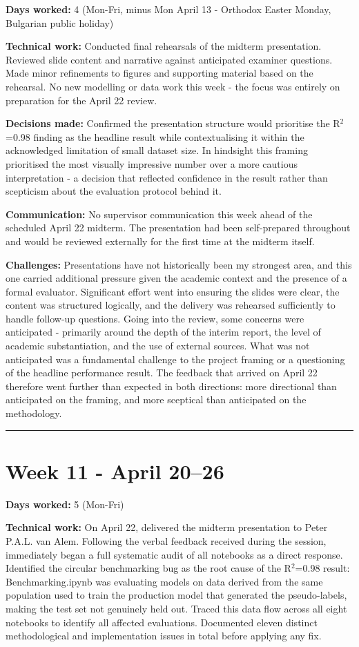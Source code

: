 \documentclass[11pt,a4paper]{article}
\begin{document}
\textbf{Days worked:} 4 (Mon-Fri, minus Mon April 13 - Orthodox Easter Monday, Bulgarian public holiday)

\textbf{Technical work:} Conducted final rehearsals of the midterm presentation. Reviewed slide content and narrative against anticipated examiner questions. Made minor refinements to figures and supporting material based on the rehearsal. No new modelling or data work this week  -  the focus was entirely on preparation for the April 22 review.

\textbf{Decisions made:} Confirmed the presentation structure would prioritise the R$^{2}$=0.98 finding as the headline result while contextualising it within the acknowledged limitation of small dataset size. In hindsight this framing prioritised the most visually impressive number over a more cautious interpretation  -  a decision that reflected confidence in the result rather than scepticism about the evaluation protocol behind it.

\textbf{Communication:} No supervisor communication this week ahead of the scheduled April 22 midterm. The presentation had been self-prepared throughout and would be reviewed externally for the first time at the midterm itself.

\textbf{Challenges:} Presentations have not historically been my strongest area, and this one carried additional pressure given the academic context and the presence of a formal evaluator. Significant effort went into ensuring the slides were clear, the content was structured logically, and the delivery was rehearsed sufficiently to handle follow-up questions. Going into the review, some concerns were anticipated  -  primarily around the depth of the interim report, the level of academic substantiation, and the use of external sources. What was not anticipated was a fundamental challenge to the project framing or a questioning of the headline performance result. The feedback that arrived on April 22 therefore went further than expected in both directions: more directional than anticipated on the framing, and more sceptical than anticipated on the methodology.
\noindent\rule{\textwidth}{0.4pt}


\section{Week 11  -  April 20–26}

\textbf{Days worked:} 5 (Mon-Fri)

\textbf{Technical work:} On April 22, delivered the midterm presentation to Peter P.A.L. van Alem. Following the verbal feedback received during the session, immediately began a full systematic audit of all notebooks as a direct response. Identified the circular benchmarking bug as the root cause of the R$^{2}$=0.98 result: Benchmarking.ipynb was evaluating models on data derived from the same population used to train the production model that generated the pseudo-labels, making the test set not genuinely held out. Traced this data flow across all eight notebooks to identify all affected evaluations. Documented eleven distinct methodological and implementation issues in total before applying any fix.
\end{document}
